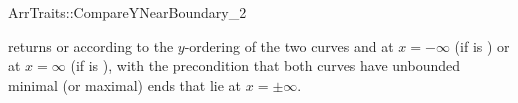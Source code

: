 \ccRefPageBegin
\begin{ccRefConcept}{ArrTraits::CompareYNearBoundary_2}
\ccRefines{}

\ccHasModels{}

  {returns  or  according to the
  $y$-ordering of the two curves  and  at $x = -\infty$
  (if  is ) or at $x = \infty$ (if  is 
  ), with the precondition that both curves have unbounded
  minimal (or maximal) ends that lie at $x = \pm\infty$.}
\end{ccRefConcept}
\ccRefPageEnd
